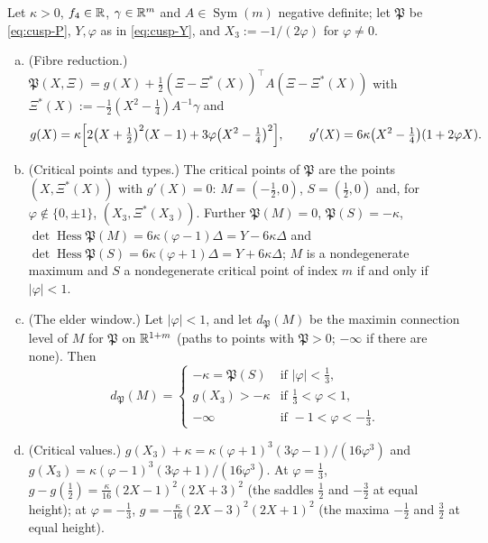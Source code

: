 \begin{theorem}\label{thm:cusp-model}
Let $\kappa>0$, $f_4\in\mathbb R$, $\gamma\in\mathbb R^m$ and $A\in\operatorname{Sym}(m)$ negative definite; let $\mathfrak P$ be \eqref{eq:cusp-P}, $Y,\varphi$ as in \eqref{eq:cusp-Y}, and $X_3:=-1/(2\varphi)$ for $\varphi\ne0$.
\begin{enumerate}[(a),leftmargin=2em]
\item (Fibre reduction.) $\mathfrak P(X,\Xi)=g(X)+\frac12(\Xi-\Xi^*(X))^{\top}A(\Xi-\Xi^*(X))$ with $\Xi^*(X):=-\frac12(X^2-\frac14)A^{-1}\gamma$ and
\begin{equation}\label{eq:cusp-g}
g(X)=\kappa\Bigl[2\bigl(X+\tfrac12\bigr)^2(X-1)+3\varphi\bigl(X^2-\tfrac14\bigr)^2\Bigr],\qquad g'(X)=6\kappa\bigl(X^2-\tfrac14\bigr)(1+2\varphi X).
\end{equation}
\item (Critical points and types.) The critical points of $\mathfrak P$ are the points $(X,\Xi^*(X))$ with $g'(X)=0$: $M=(-\frac12,0)$, $S=(\frac12,0)$ and, for $\varphi\notin\{0,\pm1\}$, $(X_3,\Xi^*(X_3))$. Further $\mathfrak P(M)=0$, $\mathfrak P(S)=-\kappa$, $\det\operatorname{Hess}\mathfrak P(M)=6\kappa(\varphi-1)\Delta=Y-6\kappa\Delta$ and $\det\operatorname{Hess}\mathfrak P(S)=6\kappa(\varphi+1)\Delta=Y+6\kappa\Delta$; $M$ is a nondegenerate maximum and $S$ a nondegenerate critical point of index $m$ if and only if $|\varphi|<1$.
\item (The elder window.) Let $|\varphi|<1$, and let $d_{\mathfrak P}(M)$ be the maximin connection level of $M$ for $\mathfrak P$ on $\mathbb R^{1+m}$ (paths to points with $\mathfrak P>0$; $-\infty$ if there are none). Then
\[
d_{\mathfrak P}(M)=\begin{cases}-\kappa=\mathfrak P(S)&\text{if }|\varphi|<\frac13,\\ g(X_3)>-\kappa&\text{if }\frac13<\varphi<1,\\ -\infty&\text{if }-1<\varphi<-\frac13 .\end{cases}
\]
\item (Critical values.) $g(X_3)+\kappa=\kappa(\varphi+1)^3(3\varphi-1)/(16\varphi^3)$ and $g(X_3)=\kappa(\varphi-1)^3(3\varphi+1)/(16\varphi^3)$. At $\varphi=\frac13$, $g-g(\frac12)=\frac\kappa{16}(2X-1)^2(2X+3)^2$ (the saddles $\frac12$ and $-\frac32$ at equal height); at $\varphi=-\frac13$, $g=-\frac\kappa{16}(2X-3)^2(2X+1)^2$ (the maxima $-\frac12$ and $\frac32$ at equal height).
\end{enumerate}
\end{theorem}

